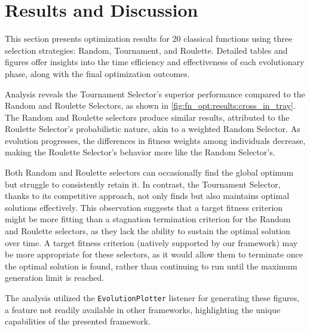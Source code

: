 \section{Results and Discussion}
\label{sec:fn_opt:results}

    This section presents optimization results for 20 classical functions using three selection strategies: Random, 
    Tournament, and Roulette. Detailed tables and figures offer insights into the time efficiency and effectiveness of 
    each evolutionary phase, along with the final optimization outcomes.

    Analysis reveals the Tournament Selector's superior performance compared to the Random and Roulette Selectors, as 
    shown in \vref{fig:fn_opt:results:cross_in_tray}. The Random and Roulette selectors produce similar results, 
    attributed to the Roulette Selector's probabilistic nature, akin to a weighted Random Selector. As evolution 
    progresses, the differences in fitness weights among individuals decrease, making the Roulette Selector's behavior 
    more like the Random Selector's.
    
    Both Random and Roulette selectors can occasionally find the global optimum but struggle to consistently retain it. 
    In contrast, the Tournament Selector, thanks to its competitive approach, not only finds but also maintains optimal 
    solutions effectively. This observation suggests that a target fitness criterion might be more fitting than a 
    stagnation termination criterion for the Random and Roulette selectors, as they lack the ability to sustain the 
    optimal solution over time. A target fitness criterion (natively supported by our framework) may be more appropriate
    for these selectors, as it would allow them to terminate once the optimal solution is found, rather than continuing
    to run until the maximum generation limit is reached.
    
    The analysis utilized the \texttt{EvolutionPlotter} listener for generating these figures, a feature not readily 
    available in other frameworks, highlighting the unique capabilities of the presented framework.

